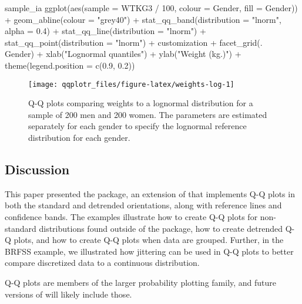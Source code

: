 \begin{Schunk}
\begin{Sinput}
sample_ia %>% 
  ggplot(aes(sample = WTKG3 / 100, colour = Gender, fill = Gender)) +
  geom_abline(colour = "grey40") +
  stat_qq_band(distribution = "lnorm", alpha = 0.4) +
  stat_qq_line(distribution = "lnorm") +
  stat_qq_point(distribution = "lnorm") +
  customization +
  facet_grid(. ~ Gender) +
  xlab("Lognormal quantiles") +
  ylab("Weight (kg.)") +
  theme(legend.position = c(0.9, 0.2))
\end{Sinput}
\begin{figure}

{\centering \texttt{[image: qqplotr\_files/figure-latex/weights-log-1]} 

}

\caption[Q-Q plots comparing weights to a lognormal distribution for a sample of 200 men and 200 women]{Q-Q plots comparing weights to a lognormal distribution for a sample of 200 men and 200 women. The parameters are estimated separately for each gender to specify the lognormal reference distribution for each gender.}\label{fig:weights-log}
\end{figure}
\end{Schunk}

\subsection{Discussion}\label{discussion}



This paper presented the  package, an extension of
 that implements Q-Q plots in both the standard and
detrended orientations, along with reference lines and confidence bands.
The examples illustrate how to create Q-Q plots for non-standard
distributions found outside of the  package, how to create
detrended Q-Q plots, and how to create Q-Q plots when data are grouped.
Further, in the BRFSS example, we illustrated how jittering can be used
in Q-Q plots to better compare discretized data to a continuous
distribution.

Q-Q plots are members of the larger probability plotting family, and
future versions of  will likely include those.


